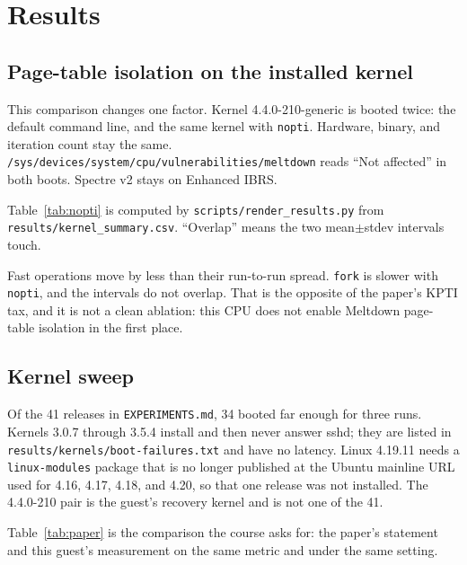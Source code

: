 \documentclass[11pt]{article}
\begin{document}
\section{Results}

\subsection{Page-table isolation on the installed kernel}
\label{sec:ext}

This comparison changes one factor. Kernel 4.4.0-210-generic is booted twice: the default command line, and the same kernel with \texttt{nopti}. Hardware, binary, and iteration count stay the same. \texttt{/sys/devices/system/cpu/vulnerabilities/meltdown} reads ``Not affected'' in both boots. Spectre v2 stays on Enhanced IBRS.

Table~\ref{tab:nopti} is computed by \texttt{scripts/render\_results.py} from \texttt{results/kernel\_summary.csv}. ``Overlap'' means the two mean$\pm$stdev intervals touch.

\begin{table}[ht]
\centering
\caption{Same kernel and binary, default command line versus \texttt{nopti}. Three runs each.}
\label{tab:nopti}

\end{table}

Fast operations move by less than their run-to-run spread. \texttt{fork} is slower with \texttt{nopti}, and the intervals do not overlap. That is the opposite of the paper's KPTI tax, and it is not a clean ablation: this CPU does not enable Meltdown page-table isolation in the first place.

\subsection{Kernel sweep}

Of the 41 releases in \texttt{EXPERIMENTS.md}, 34 booted far enough for three runs. Kernels 3.0.7 through 3.5.4 install and then never answer sshd; they are listed in \texttt{results/kernels/boot-failures.txt} and have no latency. Linux 4.19.11 needs a \texttt{linux-modules} package that is no longer published at the Ubuntu mainline URL used for 4.16, 4.17, 4.18, and 4.20, so that one release was not installed. The 4.4.0-210 pair is the guest's recovery kernel and is not one of the 41.



Table~\ref{tab:paper} is the comparison the course asks for: the paper's statement and this guest's measurement on the same metric and under the same setting.
\end{document}
